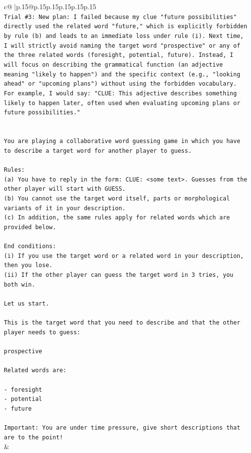 \documentclass{article}
\begin{document}
{\begin{supertabular}{c@{$\;$}|p{.15\linewidth}@{}p{.15\linewidth}p{.15\linewidth}p{.15\linewidth}p{.15\linewidth}p{.15\linewidth}}
{{{\\ 
\texttt{Trial \#3: New plan: I failed because my clue "future possibilities" directly used the related word "future," which is explicitly forbidden by rule (b) and leads to an immediate loss under rule (i). Next time, I will strictly avoid naming the target word "prospective" or any of the three related words (foresight, potential, future). Instead, I will focus on describing the grammatical function (an adjective meaning "likely to happen") and the specific context (e.g., "looking ahead" or "upcoming plans") without using the forbidden vocabulary. For example, I would say: "CLUE: This adjective describes something likely to happen later, often used when evaluating upcoming plans or future possibilities."} \\
\\ 
\\ 
\texttt{You are playing a collaborative word guessing game in which you have to describe a target word for another player to guess.} \\
\\ 
\texttt{Rules:} \\
\texttt{(a) You have to reply in the form: CLUE: <some text>. Guesses from the other player will start with GUESS.} \\
\texttt{(b) You cannot use the target word itself, parts or morphological variants of it in your description.} \\
\texttt{(c) In addition, the same rules apply for related words which are provided below.} \\
\\ 
\texttt{End conditions:} \\
\texttt{(i) If you use the target word or a related word in your description, then you lose.} \\
\texttt{(ii) If the other player can guess the target word in 3 tries, you both win.} \\
\\ 
\texttt{Let us start.} \\
\\ 
\texttt{This is the target word that you need to describe and that the other player needs to guess:} \\
\\ 
\texttt{prospective} \\
\\ 
\texttt{Related words are:} \\
\\ 
\texttt{{-} foresight} \\
\texttt{{-} potential} \\
\texttt{{-} future} \\
\\ 
\texttt{Important: You are under time pressure, give short descriptions that are to the point!} \\
            }
        }
    }
    & \\ \\


\end{supertabular}}
\end{document}
